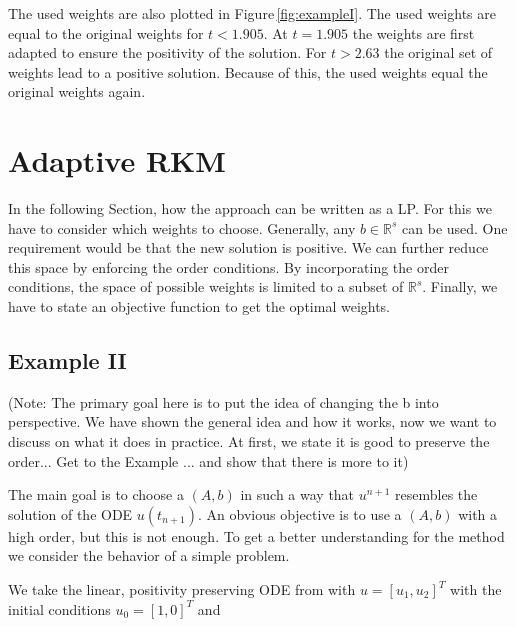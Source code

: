 \documentclass[a4paper]{article}
\numberwithin{equation}{section}
\theoremstyle{plain}
\theoremstyle{definition}
\numberwithin{theorem}{section}
\newcommand{\R}{\mathbb{R}}
\newcommand{\1}{\mathbbm{1}}
\begin{document}
The used weights are also plotted in Figure\,\ref{fig:exampleI}. 
The used weights are equal to the original weights for $t<1.905$. At $t=1.905$ the weights are first adapted to ensure the positivity of the solution. For $t>2.63$ the original set of weights lead to a positive solution. Because of this, the used weights equal the original weights again.


\section{Adaptive RKM}\label{sec:LP}

In the following Section,  how the approach can be written as a LP. 
For this we have to consider which weights to choose. 
Generally, any $b \in \R^s$ can be used. 
One requirement would be that the new solution is positive.
We can further reduce this space by enforcing the order conditions. 
By incorporating the order conditions, the space of possible weights is limited to a subset of $\R^s$. %
Finally, we have to state an objective function to get the optimal weights.


\subsection{Example II}\label{sec:example_lin}

(Note: The primary goal here is to put the idea of changing the b into perspective. We have shown the general idea and how it works, now we want to discuss on what it does in practice. At first, we state it is good to preserve the order... Get to the Example ... and show that there is more to it)


The main goal is to choose a $(A,b)$ in such a way that $u^{n+1}$ resembles the solution of the ODE $u(t_{n+1})$. 
An obvious objective is to use a $(A,b)$ with a high order, but this is not enough.
To get a better understanding for the method we consider the behavior of a simple problem.   

We take the linear, positivity preserving ODE from \cite{kopecz_unconditionally_2018} with $u = [u_1,u_2]^T$ with the initial conditions $u_0 = [1,0]^T$ and
\end{document}
